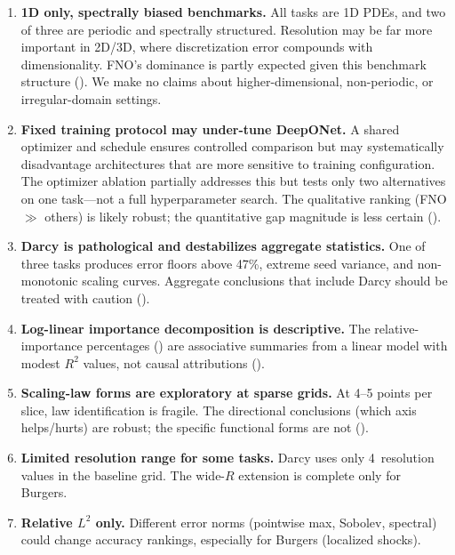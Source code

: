 \documentclass[11pt]{article}
\begin{document}
\begin{enumerate}[leftmargin=*,itemsep=2pt]
  \item \textbf{1D only, spectrally biased benchmarks.} All tasks are
    1D PDEs, and two of three are periodic and spectrally structured.
    Resolution may be far more important in 2D/3D, where
    discretization error compounds with dimensionality.
    FNO's dominance is partly expected given this benchmark structure
    ().
    We make no claims about higher-dimensional, non-periodic, or
    irregular-domain settings.

  \item \textbf{Fixed training protocol may under-tune DeepONet.}
    A shared optimizer and schedule ensures controlled comparison but
    may systematically disadvantage architectures that are more
    sensitive to training configuration.
    The optimizer ablation partially addresses this but tests only
    two alternatives on one task---not a full hyperparameter search.
    The qualitative ranking (FNO $\gg$ others) is likely robust;
    the quantitative gap magnitude is less certain
    ().

  \item \textbf{Darcy is pathological and destabilizes aggregate
    statistics.}
    One of three tasks produces error floors above 47\%,
    extreme seed variance, and non-monotonic scaling curves.
    Aggregate conclusions that include Darcy should be treated with
    caution ().

  \item \textbf{Log-linear importance decomposition is descriptive.}
    The relative-importance percentages () are
    associative summaries from a linear model with modest $R^2$
    values, not causal attributions ().

  \item \textbf{Scaling-law forms are exploratory at sparse grids.}
    At 4--5 points per slice, law identification is fragile.
    The directional conclusions (which axis helps/hurts) are robust;
    the specific functional forms are not ().

  \item \textbf{Limited resolution range for some tasks.}
    Darcy uses only 4~resolution values in the baseline grid.
    The wide-$R$ extension is complete only for Burgers.

  \item \textbf{Relative $L^2$ only.}
    Different error norms (pointwise max, Sobolev, spectral)
    could change accuracy rankings, especially for Burgers
    (localized shocks).


\end{enumerate}
\end{document}

